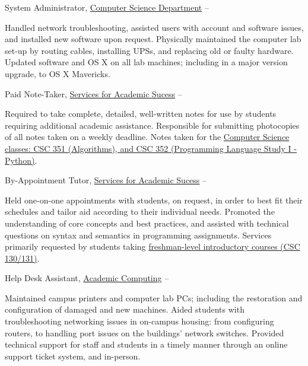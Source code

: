 \documentclass[letterpaper,MMMyyyy,nonstopmode]{simpleresumecv}
\begin{document}
\begin{Body}
\Gap
\BulletItem
System Administrator,
\href{http://cs.rocky.edu}
{Computer Science Department}
\hfill
{} --
\begin{Detail}
\SubBulletItem
Handled network troubleshooting, assisted users with account and software issues, and installed new software upon request.
\SubBulletItem
Physically maintained the computer lab set-up by routing cables, installing UPSs, and replacing old or faulty hardware.
\SubBulletItem
Updated software and OS X on all lab machines; including in a major version upgrade, to OS X Mavericks.
\end{Detail}

\Gap
\BulletItem
Paid Note-Taker,
\href{https://www.rocky.edu/student-life/student-support/academic-support/ServicesAcademicSuccess.php}
{Services for Academic Sucess}
\hfill
{} --
\begin{Detail}
\SubBulletItem
Required to take complete, detailed, well-written notes for use by students requiring additional academic assistance.
\SubBulletItem
Responsible for submitting photocopies of all notes taken on a weekly deadline.
\SubBulletItem
Notes taken for the \href{https://www.rocky.edu/academics/catalog/program/9/Computer_Science#courses-content}{Computer Science classes: CSC 351 (Algorithms), and CSC 352 (Programming Language Study I - Python)}.
\end{Detail}

\Gap
\BulletItem
By-Appointment Tutor,
\href{https://www.rocky.edu/student-life/student-support/academic-support/ServicesAcademicSuccess.php}
{Services for Academic Sucess}
\hfill
{} --
\begin{Detail}
\SubBulletItem
Held one-on-one appointments with students, on request, in order to best fit their schedules and tailor aid according to their individual needs.
\SubBulletItem
Promoted the understanding of core concepts and best practices, and assisted with technical questions on syntax and semantics in programming assignments.
\SubBulletItem
Services primarily requested by students taking \href{https://www.rocky.edu/academics/catalog/program/9/Computer_Science#courses-content}{freshman-level introductory courses (CSC 130/131)}.
\end{Detail}

\Gap
\BulletItem
Help Desk Assistant,
\href{https://rocky.edu/student-life/student-support/academic-computing/}
{Academic Computing}
\hfill
{} --
\begin{Detail}
\SubBulletItem
Maintained campus printers and computer lab PCs; including the restoration and configuration of damaged and new machines.
\SubBulletItem
Aided students with troubleshooting networking issues in on-campus housing: from configuring routers, to handling port issues on the buildings' network switches.
\SubBulletItem
Provided technical support for staff and students in a timely manner through an online support ticket system, and in-person.
\end{Detail}


\end{Body}
\end{document}
